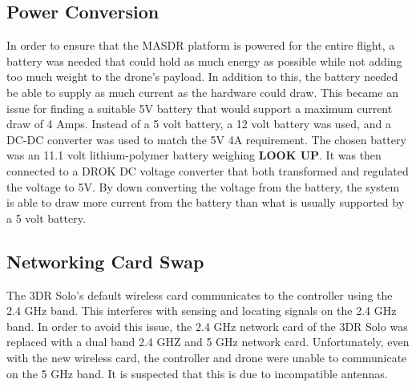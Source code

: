 \subsection{Power Conversion}
In order to ensure that the MASDR platform is powered for the entire flight, a battery was needed that could hold as much energy as possible while not adding too much weight to the drone’s payload. In addition to this, the battery needed be able to supply as much current as the hardware could draw. This became an issue for finding a suitable 5V battery that would support a maximum current draw of 4 Amps. Instead of a 5 volt battery, a 12 volt battery was used, and a DC-DC converter was used to match the 5V 4A requirement. The chosen battery was an 11.1 volt lithium-polymer battery weighing \textbf{LOOK UP}. It was then connected to a DROK DC voltage converter that both transformed and regulated the voltage to 5V. By down converting the voltage from the battery, the system is able to draw more current from the battery than what is usually supported by a 5 volt battery.
\subsection{Networking Card Swap}
The 3DR Solo’s default wireless card communicates to the controller using the 2.4 GHz band. This interferes with sensing and locating signals on the 2.4 GHz band. In order to avoid this issue, the 2.4 GHz network card of the 3DR Solo was replaced with a dual band 2.4 GHZ and 5 GHz network card. Unfortunately, even with the new wireless card, the controller and drone were unable to communicate on the 5 GHz band. It is suspected that this is due to incompatible antennas.
